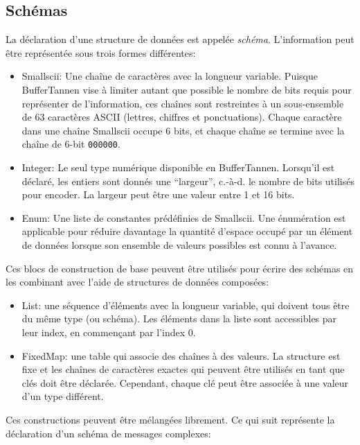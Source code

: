 \subsection{Schémas}
\setcounter{paragraph}{0}

La déclaration d'une structure de données est appelée \emph{schéma}. L'information peut être représentée sous trois formes différentes:

\begin{itemize}
\item Smallscii: Une chaîne de caractères avec la longueur variable. Puisque BufferTannen vise à limiter autant que possible le nombre de bits requis pour représenter de l'information, ces chaînes sont restreintes à un sous-ensemble de 63 caractères ASCII (lettres, chiffres et ponctuations). Chaque caractère dans une chaîne Smallscii occupe 6 bits, et chaque chaîne se termine avec la chaîne de 6-bit \verb+000000+.

\item Integer: Le seul type numérique disponible en BufferTannen. Lorsqu'il est déclaré, les entiers sont donnés une ``largeur'', c.-à-d. le nombre de bits utilisés pour encoder. La largeur peut être une valeur entre 1 et 16 bits.

\item Enum: Une liste de constantes prédéfinies de Smallscii. Une énumération est applicable pour réduire davantage la quantité d'espace occupé par un élément de données lorsque son ensemble de valeurs possibles est connu à l'avance.
\end{itemize}

Ces blocs de construction de base peuvent être utilisés pour écrire des schémas en les combinant avec l'aide de structures de données composées:

\begin{itemize}
\item List: une séquence d'éléments avec la longueur variable, qui doivent tous être du même type (ou schéma). Les éléments dans la liste sont accessibles par leur index, en commençant par l'index 0.
\item FixedMap: une table qui associe des chaînes à des valeurs. La structure est fixe et les chaînes de caractères exactes qui peuvent être utilisés en tant que clés doit être déclarée. Cependant, chaque clé peut être associée à une valeur d'un type différent.
\end{itemize}

Ces constructions peuvent être mélangées librement. Ce qui suit représente la déclaration d'un schéma de messages complexes:

